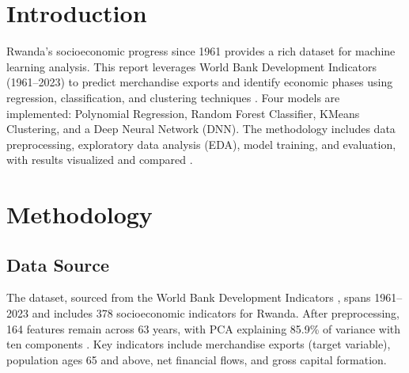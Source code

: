 \documentclass[12pt]{article}
\begin{document}
	\section{Introduction}
	Rwanda's socioeconomic progress since 1961 \citep{un2020} provides a rich dataset for machine learning analysis. This report leverages World Bank Development Indicators (1961–2023) to predict merchandise exports and identify economic phases using regression, classification, and clustering techniques \citep{worldbank2023}. Four models are implemented: Polynomial Regression, Random Forest Classifier, KMeans Clustering, and a Deep Neural Network (DNN). The methodology includes data preprocessing, exploratory data analysis (EDA), model training, and evaluation, with results visualized and compared \citep{hastie2009}.
	
	\section{Methodology}
	
	\subsection{Data Source}
	The dataset, sourced from the World Bank Development Indicators \citep{worldbank2023}, spans 1961–2023 and includes 378 socioeconomic indicators for Rwanda. After preprocessing, 164 features remain across 63 years, with PCA explaining 85.9\% of variance with ten components \citep{hastie2009}. Key indicators include merchandise exports (target variable), population ages 65 and above, net financial flows, and gross capital formation.
	
\end{document}
